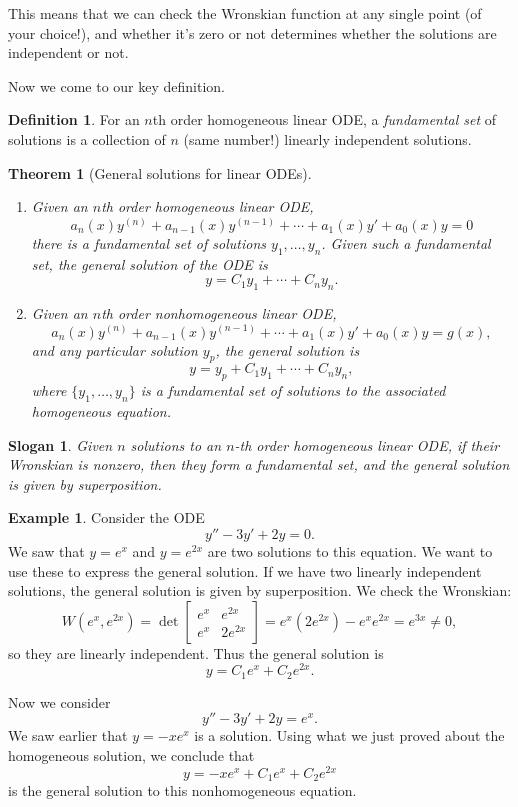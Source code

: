 \documentclass[12pt]{amsart}
\numberwithin{equation}{section}
\theoremstyle{plain} %
\newtheorem{thm}[equation]{Theorem}
\newtheorem{slogan}[equation]{Slogan}
\theoremstyle{definition}
\newtheorem{defn}[equation]{Definition}
\newtheorem{ex}[equation]{Example}
\theoremstyle{remark}
\begin{document}
This means that we can check the Wronskian function at any single point (of your choice!), and whether it's zero or not determines whether the solutions are independent or not.


Now we come to our key definition.

\begin{defn} For an $n$th order homogeneous linear ODE, a \emph{fundamental set} of solutions is a collection of $n$ (same number!) linearly independent solutions.
\end{defn}

\begin{thm}[General solutions for linear ODEs] \quad
\begin{enumerate} 
\item
Given an $n$th order homogeneous linear ODE,
\[ a_n(x) y^{(n)} + a_{n-1}(x) y^{(n-1)} + \cdots + a_1(x) y' + a_0(x) y = 0\]
there is a fundamental set of solutions $y_1,\dots,y_n$. Given such a fundamental set, the general solution of the ODE is
\[y = C_1 y_1 + \cdots + C_n y_n.\]
\item Given an $n$th order nonhomogeneous linear ODE,
 \[ a_n(x) y^{(n)} + a_{n-1}(x) y^{(n-1)} + \cdots + a_1(x) y' + a_0(x) y = g(x),\]
 and any particular solution $y_p$, the general solution is 
\[y = y_p + C_1 y_1 + \cdots + C_n y_n,\]
where $\{y_1,\dots,y_n\}$ is a fundamental set of solutions to the associated homogeneous equation.
\end{enumerate}
\end{thm}

\begin{slogan} Given $n$ solutions to an $n$-th order homogeneous linear ODE, if their Wronskian is nonzero, then they form a fundamental set, and the general solution is given by superposition. \end{slogan}



\begin{ex}
Consider the ODE
\[ y'' - 3y' + 2y = 0.\]
We saw that $y=e^x$ and $y=e^{2x}$ are two solutions to this equation. We want to use these to express the general solution. If we have two linearly independent solutions, the general solution is given by superposition. We check the Wronskian:
\[ W(e^x,e^{2x}) = \det \begin{bmatrix} e^x & e^{2x} \\ e^x & 2 e^{2x} \end{bmatrix} = e^x (2e^{2x}) - e^x e^{2x} = e^{3x} \neq 0,\]
so they are linearly independent. Thus the general solution is
\[ y = C_1 e^x + C_2 e^{2x}.\]

Now we consider 
\[y'' - 3y' + 2y = e^{x}.\]
We saw earlier that $y=-xe^x$ is a solution. Using what we just proved about the homogeneous solution, we conclude that
\[ y=-xe^x + C_1 e^x + C_2 e^{2x}\]
is the general solution to this nonhomogeneous equation.
\end{ex}
\end{document}
